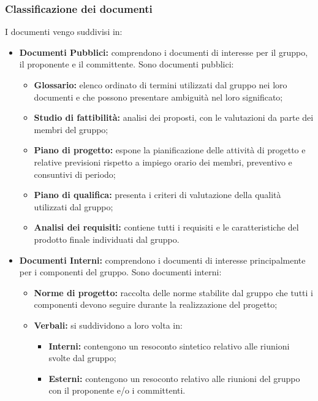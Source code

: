 \subsubsection{Classificazione dei documenti}\label{ClassificazioneDocumenti}
I documenti vengo suddivisi in:
\begin{itemize}
	\item \textbf{Documenti Pubblici:} comprendono i documenti di interesse per il gruppo, il proponente e il committente. 
	Sono documenti pubblici:
	\begin{itemize}
		\item \textbf{Glossario:} elenco ordinato di termini utilizzati dal gruppo nei loro documenti e che possono presentare ambiguità nel loro significato;
		\item \textbf{Studio di fattibilità:} analisi dei  proposti, con le valutazioni da parte dei membri del gruppo;
		\item \textbf{Piano di progetto:} espone la pianificazione delle attività di progetto e relative previsioni rispetto a impiego orario dei membri, preventivo e consuntivi di periodo;
		\item \textbf{Piano di qualifica:} presenta i criteri di valutazione della qualità utilizzati dal gruppo;
		\item \textbf{Analisi dei requisiti:} contiene tutti i requisiti e le caratteristiche del prodotto finale individuati dal gruppo.
	\end{itemize}
	\item \textbf{Documenti Interni:} comprendono i documenti di interesse principalmente per i componenti del gruppo.
	Sono documenti interni:
	\begin{itemize}
		\item \textbf{Norme di progetto:} raccolta delle norme stabilite dal gruppo che tutti i componenti devono seguire durante la realizzazione del progetto;
		\item \textbf{Verbali:} si suddividono a loro volta in:
		\begin{itemize}
			\item \textbf{Interni:} contengono un resoconto sintetico relativo alle riunioni svolte dal gruppo;
			\item \textbf{Esterni:} contengono un resoconto relativo alle riunioni del gruppo con il proponente e/o i committenti.
		\end{itemize}
	\end{itemize}
\end{itemize}

